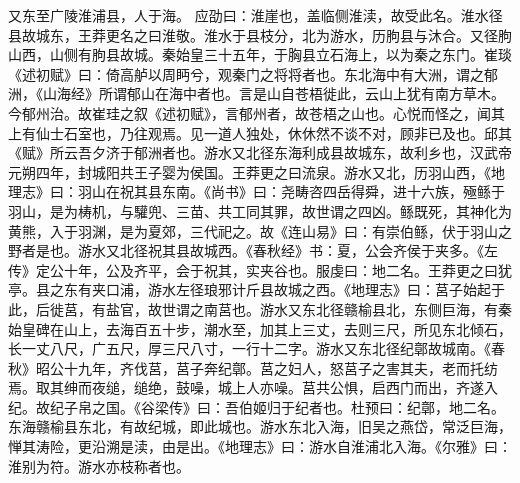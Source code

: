 \documentclass[12pt,UTF8]{ctexbook}
\begin{document}
又东至广陵淮浦县，人于海。
应劭曰：淮崖也，盖临侧淮渎，故受此名。淮水径县故城东，王莽更名之曰淮敬。淮水于县枝分，北为游水，历朐县与沐合。又径朐山西，山侧有朐县故城。秦始皇三十五年，于胸县立石海上，以为秦之东门。崔琰《述初赋》曰：倚高舻以周眄兮，观秦门之将将者也。东北海中有大洲，谓之郁洲，《山海经》所谓郁山在海中者也。言是山自苍梧徙此，云山上犹有南方草木。今郁州治。故崔珪之叙《述初赋》，言郁州者，故苍梧之山也。心悦而怪之，闻其上有仙士石室也，乃往观焉。见一道人独处，休休然不谈不对，顾非已及也。邱其《赋》所云吾夕济于郁洲者也。游水又北径东海利成县故城东，故利乡也，汉武帝元朔四年，封城阳共王子婴为侯国。王莽更之曰流泉。游水又北，历羽山西，《地理志》曰：羽山在祝其县东南。《尚书》曰：尧畴咨四岳得舜，进十六族，殛鲧于羽山，是为梼机，与驩兜、三苗、共工同其罪，故世谓之四凶。鲧既死，其神化为黄熊，入于羽渊，是为夏郊，三代祀之。故《连山易》曰：有崇伯鲧，伏于羽山之野者是也。游水又北径祝其县故城西。《春秋经》书：夏，公会齐侯于夹多。《左传》定公十年，公及齐平，会于祝其，实夹谷也。服虔曰：地二名。王莽更之曰犹亭。县之东有夹口浦，游水左径琅邪计斤县故城之西。《地理志》曰：莒子始起于此，后徙莒，有盐官，故世谓之南莒也。游水又东北径赣榆县北，东侧巨海，有秦始皇碑在山上，去海百五十步，潮水至，加其上三丈，去则三尺，所见东北倾石，长一丈八尺，广五尺，厚三尺八寸，一行十二字。游水又东北径纪鄣故城南。《春秋》昭公十九年，齐伐莒，莒子奔纪鄣。莒之妇人，怒莒子之害其夫，老而托纺焉。取其绅而夜缒，缒绝，鼓噪，城上人亦噪。莒共公惧，启西门而出，齐遂入纪。故纪子帛之国。《谷梁传》曰：吾伯姬归于纪者也。杜预曰：纪鄣，地二名。东海赣榆县东北，有故纪城，即此城也。游水东北入海，旧吴之燕岱，常泛巨海，惮其涛险，更沿溯是渎，由是出。《地理志》曰：游水自淮浦北入海。《尔雅》曰：淮别为符。游水亦枝称者也。
\end{document}
